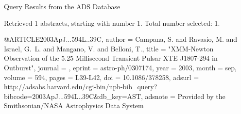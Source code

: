Query Results from the ADS Database


Retrieved 1 abstracts, starting with number 1.  Total number selected: 1.

@ARTICLE{2003ApJ...594L..39C,
   author = {{Campana}, S. and {Ravasio}, M. and {Israel}, G.~L. and {Mangano}, V. and 
	{Belloni}, T.},
    title = "{XMM-Newton Observation of the 5.25 Millisecond Transient Pulsar XTE J1807-294 in Outburst}",
  journal = {\apjl},
   eprint = {astro-ph/0307174},
     year = 2003,
    month = sep,
   volume = 594,
    pages = {L39-L42},
      doi = {10.1086/378258},
   adsurl = {http://adsabs.harvard.edu/cgi-bin/nph-bib_query?bibcode=2003ApJ...594L..39C&db_key=AST},
  adsnote = {Provided by the Smithsonian/NASA Astrophysics Data System}
}


